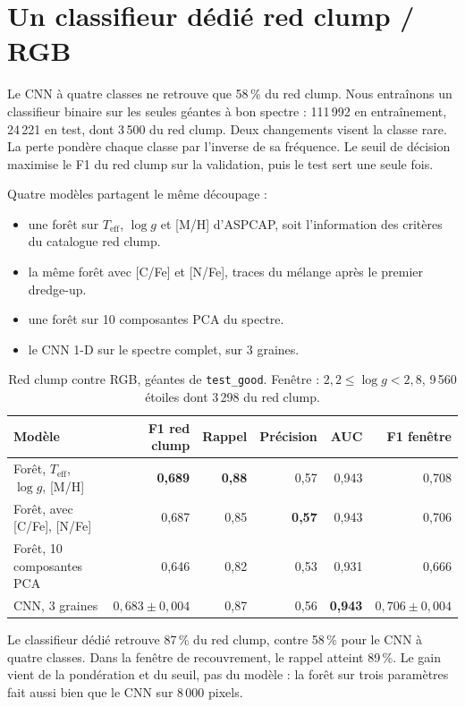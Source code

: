 \documentclass[11pt,a4paper]{article}
\newcommand{\teff}{$T_{\mathrm{eff}}$}
\begin{document}
\section{Un classifieur dédié red clump / RGB}
\label{sec:rcrgb}

Le CNN à quatre classes ne retrouve que 58\,\% du red clump. Nous entraînons un classifieur binaire sur les seules géantes à bon spectre : 111\,992 en entraînement, 24\,221 en test, dont 3\,500 du red clump. Deux changements visent la classe rare. La perte pondère chaque classe par l'inverse de sa fréquence. Le seuil de décision maximise le F1 du red clump sur la validation, puis le test sert une seule fois.

Quatre modèles partagent le même découpage :
\begin{itemize}
  \item une forêt sur \teff{}, $\log g$ et [M/H] d'ASPCAP, soit l'information des critères du catalogue red clump.
  \item la même forêt avec [C/Fe] et [N/Fe], traces du mélange après le premier dredge-up.
  \item une forêt sur 10 composantes PCA du spectre.
  \item le CNN 1-D sur le spectre complet, sur 3 graines.
\end{itemize}

\begin{table}[H]
\centering
\caption{Red clump contre RGB, géantes de \texttt{test\_good}. Fenêtre : $2{,}2 \leq \log g < 2{,}8$, 9\,560 étoiles dont 3\,298 du red clump.}
\label{tab:rcrgb}
\begin{tabular}{lrrrrr}
\toprule
Modèle & F1 red clump & Rappel & Précision & AUC & F1 fenêtre \\
\midrule
Forêt, \teff{}, $\log g$, [M/H] & \textbf{0,689} & \textbf{0,88} & 0,57 & 0,943 & 0,708 \\
Forêt, avec [C/Fe], [N/Fe] & 0,687 & 0,85 & \textbf{0,57} & 0,943 & 0,706 \\
Forêt, 10 composantes PCA & 0,646 & 0,82 & 0,53 & 0,931 & 0,666 \\
CNN, 3 graines & $0{,}683 \pm 0{,}004$ & 0,87 & 0,56 & \textbf{0,943} & $0{,}706 \pm 0{,}004$ \\
\bottomrule
\end{tabular}
\end{table}

Le classifieur dédié retrouve 87\,\% du red clump, contre 58\,\% pour le CNN à quatre classes. Dans la fenêtre de recouvrement, le rappel atteint 89\,\%. Le gain vient de la pondération et du seuil, pas du modèle : la forêt sur trois paramètres fait aussi bien que le CNN sur 8\,000 pixels.
\end{document}
